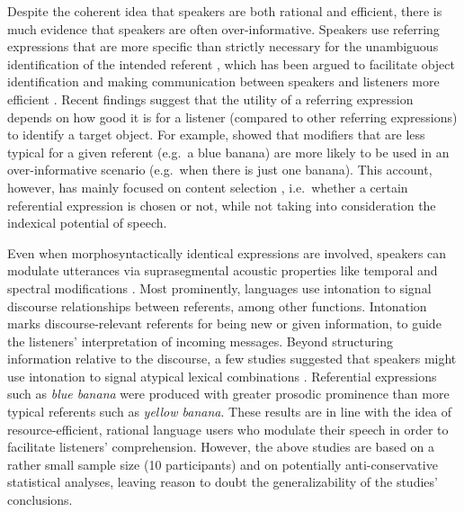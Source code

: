 \documentclass[Review,times,sageh]{sagej}
\begin{document}
Despite the coherent idea that speakers are both rational and efficient, there is much evidence that speakers are often over-informative.
Speakers use referring expressions that are more specific than strictly necessary for the unambiguous identification of the intended referent \citep{sedivy2003pragmatic, westerbeek2015stored, rubio2016redundant}, which has been argued to facilitate object identification and making communication between speakers and listeners more efficient \citep{arts2011overspecification, paraboni2007generating, rubio2016redundant}.
Recent findings suggest that the utility of a referring expression depends on how good it is for a listener (compared to other referring expressions) to identify a target object.
For example, \citet{degen2020redundancy} showed that modifiers that are less typical for a given referent (e.g.~a blue banana) are more likely to be used in an over-informative scenario (e.g.~when there is just one banana).
This account, however, has mainly focused on content selection \citep{gatt2013we}, i.e.~whether a certain referential expression is chosen or not, while not taking into consideration the indexical potential of speech.

Even when morphosyntactically identical expressions are involved, speakers can modulate utterances via suprasegmental acoustic properties like temporal and spectral modifications \citep[e.g.,][]{ladd2008intonational}.
Most prominently, languages use intonation to signal discourse relationships between referents, among other functions.
Intonation marks discourse-relevant referents for being new or given information, to guide the listeners' interpretation of incoming messages.
Beyond structuring information relative to the discourse, a few studies suggested that speakers might use intonation to signal atypical lexical combinations \citep[e.g.][]{dimitrova2008prosodic, dimitrova2009did}.
Referential expressions such as \emph{blue banana} were produced with greater prosodic prominence than more typical referents such as \emph{yellow banana}.
These results are in line with the idea of resource-efficient, rational language users who modulate their speech in order to facilitate listeners' comprehension.
However, the above studies are based on a rather small sample size (10 participants) and on potentially anti-conservative statistical analyses, leaving reason to doubt the generalizability of the studies' conclusions.
\end{document}
